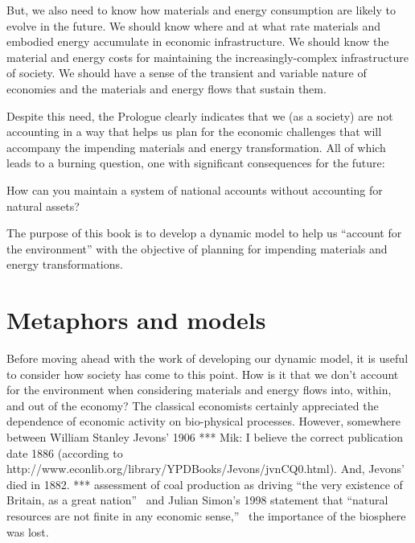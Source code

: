 But, we also need to know how materials and energy consumption 
are likely to evolve in the future.
We should know where and at what rate 
materials and embodied energy accumulate 
in economic infrastructure. 
We should know the material and energy costs for maintaining the
increasingly-complex infrastructure of society.
We should have a sense of the transient and variable nature of economies
and the materials and energy flows that sustain them.

Despite this need,
the Prologue clearly indicates that we (as a society) 
are not accounting in a way that helps us plan 
for the economic challenges that will accompany 
the impending materials and energy transformation.
All of which leads to a burning question,
one with significant consequences for the future:

\vspace{5 mm}
\noindent{}How can you maintain a system of national accounts without accounting for natural assets?
\vspace{5 mm}

The purpose of this book is to develop a dynamic model to help us
``account for the environment''
with the objective of planning for impending materials and energy transformations.


\section{Metaphors and models}
\label{sec:metaphors_and_models}

Before moving ahead with the work of developing our dynamic model,
it is useful to consider how society has come to this point.
How is it that we don't account for the environment when 
considering materials and energy flows into, within, and out of the economy?
The classical economists certainly appreciated the dependence of
economic activity on bio-physical processes.\cite{Cleveland1987, Hall2011, Dale2012}
However, somewhere between William Stanley Jevons' 1906
*** Mik: I believe the correct publication date 1886 (according to
http://www.econlib.org/library/YPDBooks/Jevons/jvnCQ0.html). 
And, Jevons' died in
1882. *** assessment of 
coal production as driving ``the very existence of Britain, as a great nation''~\cite[p.~57]{Jevons1906}
and Julian Simon's 1998 statement that
``natural resources are not finite in any economic sense,''~\cite[p.~54]{Simon1998} %
the importance of the biosphere was lost.


